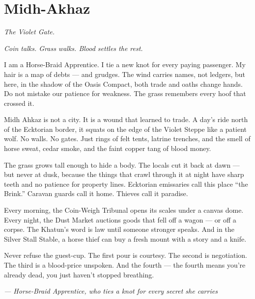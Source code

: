 \newpage

\newpage

\chapter{Midh-Akhaz}
\emph{The Violet Gate.}

\noindent
{\Large
\textit{Coin talks. Grass walks. Blood settles the rest.}

\vspace{0.5em}

I am a Horse-Braid Apprentice. I tie a new knot for every paying passenger. My hair is a map of debts --- and grudges. The wind carries names, not ledgers, but here, in the shadow of the Oasis Compact, both trade and oaths change hands. Do not mistake our patience for weakness. The grass remembers every hoof that crossed it.

\vspace{0.5em}

Midh Ahkaz is not a city. It is a wound that learned to trade. A day's ride north of the Ecktorian border, it squats on the edge of the Violet Steppe like a patient wolf. No walls. No gates. Just rings of felt tents, latrine trenches, and the smell of horse sweat, cedar smoke, and the faint copper tang of blood money.

\vspace{0.5em}

The grass grows tall enough to hide a body. The locals cut it back at dawn --- but never at dusk, because the things that crawl through it at night have sharp teeth and no patience for property lines. Ecktorian emissaries call this place ``the Brink.'' Caravan guards call it home. Thieves call it paradise.

\vspace{0.5em}

Every morning, the Coin-Weigh Tribunal opens its scales under a canvas dome. Every night, the Dust Market auctions goods that fell off a wagon --- or off a corpse. The Khatun's word is law until someone stronger speaks. And in the Silver Stall Stable, a horse thief can buy a fresh mount with a story and a knife.

\vspace{0.5em}

Never refuse the guest-cup. The first pour is courtesy. The second is negotiation. The third is a blood-price unspoken. And the fourth --- the fourth means you're already dead, you just haven't stopped breathing.

\vspace{1em}

\noindent\textit{--- Horse-Braid Apprentice, who ties a knot for every secret she carries}
}


